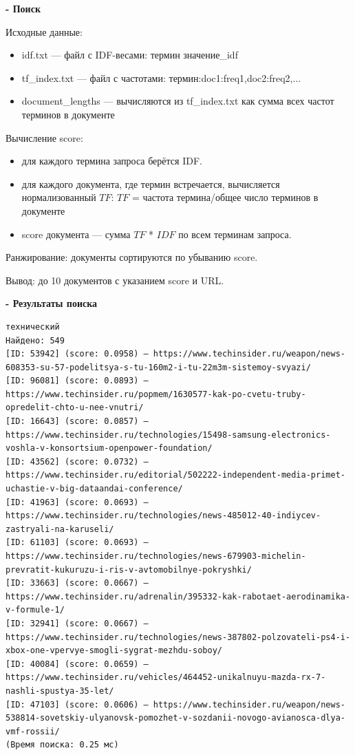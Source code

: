 \documentclass[pdf, unicode, 12pt, a4paper, oneside, fleqn]{article}
\begin{document}
\textbf{- Поиск}

Исходные данные:
\begin{itemize}
    \item idf.txt — файл с IDF-весами: термин значение\_idf
    \item tf\_index.txt — файл с частотами: термин:doc1:freq1,doc2:freq2,...
    \item document\_lengths — вычисляются из tf\_index.txt как сумма всех частот терминов в документе
\end{itemize}

Вычисление score:
\begin{itemize}
    \item для каждого термина запроса берётся IDF.
    \item для каждого документа, где термин встречается, вычисляется нормализованный $TF$: $TF$ = частота термина/общее число терминов в документе
    \item score документа — сумма $TF$ * $IDF$ по всем терминам запроса.
\end{itemize}

Ранжирование: документы сортируются по убыванию score.

Вывод: до 10 документов с указанием score и URL.

\textbf{- Результаты поиска}

\begin{verbatim}
технический
Найдено: 549
[ID: 53942] (score: 0.0958) — https://www.techinsider.ru/weapon/news-608353-su-57-podelitsya-s-tu-160m2-i-tu-22m3m-sistemoy-svyazi/
[ID: 96081] (score: 0.0893) — https://www.techinsider.ru/popmem/1630577-kak-po-cvetu-truby-opredelit-chto-u-nee-vnutri/
[ID: 16643] (score: 0.0857) — https://www.techinsider.ru/technologies/15498-samsung-electronics-voshla-v-konsortsium-openpower-foundation/        
[ID: 43562] (score: 0.0732) — https://www.techinsider.ru/editorial/502222-independent-media-primet-uchastie-v-big-dataandai-conference/
[ID: 41963] (score: 0.0693) — https://www.techinsider.ru/technologies/news-485012-40-indiycev-zastryali-na-karuseli/
[ID: 61103] (score: 0.0693) — https://www.techinsider.ru/technologies/news-679903-michelin-prevratit-kukuruzu-i-ris-v-avtomobilnye-pokryshki/     
[ID: 33663] (score: 0.0667) — https://www.techinsider.ru/adrenalin/395332-kak-rabotaet-aerodinamika-v-formule-1/
[ID: 32941] (score: 0.0667) — https://www.techinsider.ru/technologies/news-387802-polzovateli-ps4-i-xbox-one-vpervye-smogli-sygrat-mezhdu-soboy/  
[ID: 40084] (score: 0.0659) — https://www.techinsider.ru/vehicles/464452-unikalnuyu-mazda-rx-7-nashli-spustya-35-let/
[ID: 47103] (score: 0.0606) — https://www.techinsider.ru/weapon/news-538814-sovetskiy-ulyanovsk-pomozhet-v-sozdanii-novogo-avianosca-dlya-vmf-rossii/
(Время поиска: 0.25 мс)
\end{verbatim}
\end{document}
